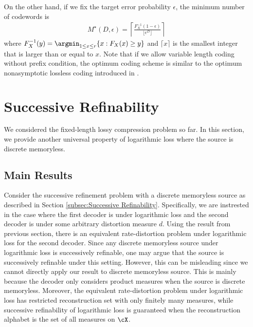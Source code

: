 \documentclass[draftclsnofoot, onecolumn, letterpaper, romanappendices]{IEEEtran}
\begin{document}
On the other hand, if we fix the target error probability $\epsilon$,
the minimum number of codewords is
\begin{align*}
    M^{\star}(D,\epsilon) = \left\lceil\frac{F_X^{-1}(1-\epsilon)}{\lfloor e^D \rfloor}\right\rceil
\end{align*}
where $F_X^{-1}(y) = \argmin_{1\leq x\leq r} \{x: F_X(x)\geq y\}$
and $\lceil x\rceil$ is the smallest integer that is larger than or equal to $x$.
Note that if we allow variable length coding without prefix condition,
the optimum coding scheme is similar to the optimum nonasymptotic lossless coding introduced in \cite{kontoyiannis2014optimal}.










\section{Successive Refinability}\label{sec:Successive Refinability}
We considered the fixed-length lossy compression problem so far.
In this section, we provide another universal property of logarithmic loss
where the source is discrete memoryless.

\subsection{Main Results}

Consider the successive refinement problem with a discrete memoryless source as described in Section \ref{subsec:Successive Refinability}.
Specifically, we are instrested in the case where the first decoder is under logarithmic loss
and the second decoder is under some arbitrary distortion measure $d$.
Using the result from previous section, there is an equivalent rate-distortion problem
under logarithmic loss for the second decoder.
Since any discrete memoryless source under logarithmic loss is successively refinable,
one may argue that the source is successively refinable under this setting.
However, this can be misleading since we cannot directly apply our result to
discrete memoryless source.
This is mainly because the decoder only considers product measures
when the source is discrete memoryless.
Moreover, the equivalent rate-distortion problem under logarithmic loss has
restricted reconstruction set with only finitely many measures,
while successive refinability of logarithmic loss is guaranteed
when the reconstruction alphabet is the set of all measures on $\cX$.
\end{document}
